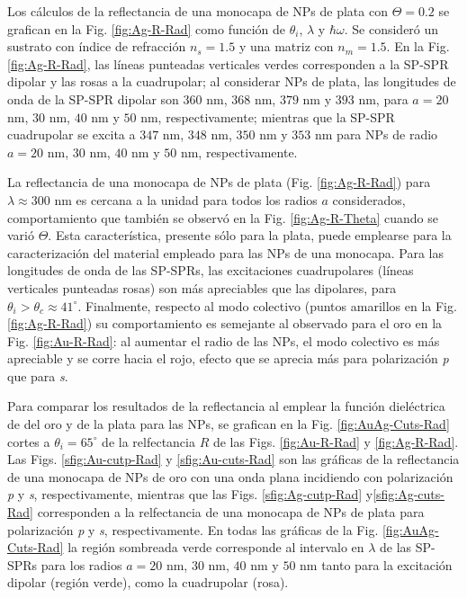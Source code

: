 Los cálculos de la reflectancia de una monocapa de NPs de plata con $\Theta= 0.2$ se grafican en la Fig. \ref{fig:Ag-R-Rad} como función de $\theta_i$, $\lambda$ y $\hbar\omega$. Se consideró un sustrato con índice de refracción $n_s=1.5$ y una matriz con $n_m=1.5$. En la Fig. \ref{fig:Ag-R-Rad}, las líneas punteadas verticales verdes corresponden a la SP-SPR dipolar y las rosas a la cuadrupolar; al considerar NPs de plata, las longitudes de onda de la SP-SPR dipolar son $360$ nm, $368$ nm, $379$ nm y $393$ nm, para $a = 20$ nm, $30$ nm, $40$ nm y $50$ nm, respectivamente; mientras que  la SP-SPR cuadrupolar se excita a $347$ nm, $348$ nm, $350$ nm y $353$ nm para NPs de radio $a = 20$ nm, $30$ nm, $40$ nm y $50$ nm, respectivamente.

La reflectancia de una monocapa de NPs de plata (Fig. \ref{fig:Ag-R-Rad}) para $\lambda\approx 300$ nm es cercana a la unidad para todos los radios $a$ considerados, comportamiento que también se observó en la Fig. \ref{fig:Ag-R-Theta} cuando se varió $\Theta$. Esta característica, presente sólo para la plata, puede emplearse para la caracterización del material empleado para las NPs de una monocapa. Para las longitudes de onda de las SP-SPRs, las excitaciones cuadrupolares (líneas verticales punteadas rosas) son más apreciables que las dipolares, para $\theta_i>\theta_c\approx 41^\circ$. Finalmente, respecto al  modo colectivo (puntos amarillos en la Fig. \ref{fig:Ag-R-Rad}) su comportamiento es semejante al observado para el oro en la Fig. \ref{fig:Au-R-Rad}: al aumentar el radio de las NPs, el modo colectivo es más apreciable y se corre hacia el rojo, efecto que se aprecia más para polarización \emph{p} que para \emph{s}.

Para comparar los resultados de la reflectancia al emplear la función dieléctrica de del oro y de la plata para las NPs, se grafican en la Fig. \ref{fig:AuAg-Cuts-Rad} cortes a $\theta_i = 65^\circ$ de la relfectancia $R$ de las Figs. \ref{fig:Au-R-Rad} y \ref{fig:Ag-R-Rad}. Las Figs. \ref{sfig:Au-cutp-Rad} y \ref{sfig:Au-cuts-Rad} son las gráficas de la reflectancia de una monocapa de NPs de oro con una onda plana incidiendo con polarización \emph{p} y \emph{s}, respectivamente, mientras que las Figs.  \ref{sfig:Ag-cutp-Rad} y\ref{sfig:Ag-cuts-Rad}  corresponden a la relfectancia de una monocapa de NPs de plata para polarización \emph{p} y \emph{s}, respectivamente. En todas las gráficas de la Fig. \ref{fig:AuAg-Cuts-Rad} la región sombreada verde corresponde al intervalo en $\lambda$ de las SP-SPRs para los radios $a=20$ nm, $30$ nm, $40$ nm y $50$ nm tanto para la excitación dipolar (región verde), como la cuadrupolar (rosa). 

